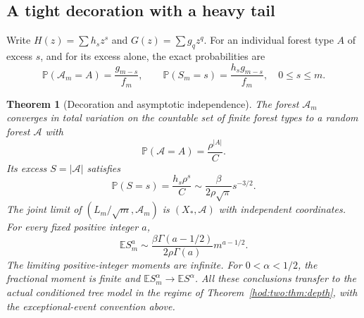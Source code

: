 \documentclass[11pt,letterpaper]{article}
\newtheorem{theorem}{Theorem}[section]
\theoremstyle{definition}\newtheorem{definition}[theorem]{Definition}
\theoremstyle{remark}\newtheorem{remark}[theorem]{Remark}
\newcommand{\Pp}{\mathbb P}
\newcommand{\Ee}{\mathbb E}
\begin{document}
\subsection{A tight decoration with a heavy tail}
Write $H(z)=\sum h_sz^s$ and $G(z)=\sum g_qz^q$. For an individual forest type $A$ of excess $s$, and for its excess alone, the exact probabilities are
\begin{equation}\label{hod:two:eq:decorfinite}
\Pp(\mathcal A_m=A)=\frac{g_{m-s}}{f_m},\qquad
\Pp(S_m=s)=\frac{h_sg_{m-s}}{f_m},\quad 0\le s\le m.
\end{equation}

\begin{theorem}[Decoration and asymptotic independence]\label{hod:two:thm:decoration}
The forest $\mathcal A_m$ converges in total variation on the countable set of finite forest types to a random forest $\mathcal A$ with
\begin{equation}\label{hod:two:eq:decorlimit}
\Pp(\mathcal A=A)=\frac{\rho^{|A|}}C.
\end{equation}
Its excess $S=|\mathcal A|$ satisfies
\begin{equation}\label{hod:two:eq:decortail}
\Pp(S=s)=\frac{h_s\rho^s}C
\sim\frac{\beta}{2\rho\sqrt\pi}s^{-3/2}.
\end{equation}
The joint limit of $(L_m/\sqrt m,\mathcal A_m)$ is $(X_*,\mathcal A)$ with independent coordinates. For every fixed positive integer $a$,
\begin{equation}\label{hod:two:eq:decormom}
\Ee S_m^a\sim
\frac{\beta\Gamma(a-1/2)}{2\rho\Gamma(a)}m^{a-1/2}.
\end{equation}
The limiting positive-integer moments are infinite. For $0<\alpha<1/2$, the fractional moment is finite and $\Ee S_m^\alpha\to\Ee S^\alpha$.
All these conclusions transfer to the actual conditioned tree model in the regime of Theorem~\ref{hod:two:thm:depth}, with the exceptional-event convention above.
\end{theorem}
\end{document}
